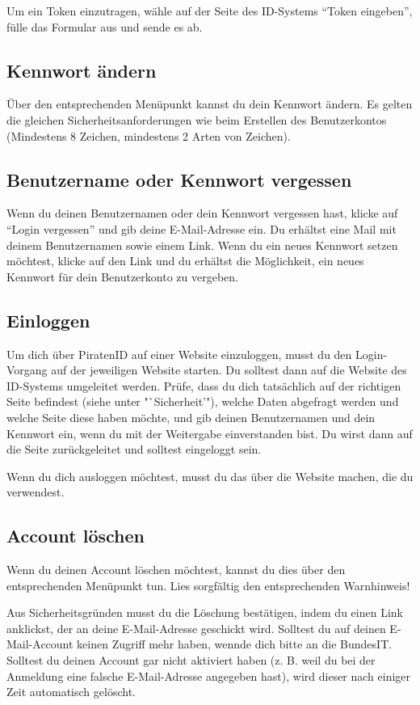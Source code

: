Um ein Token einzutragen, wähle auf der Seite des ID-Systems "`Token eingeben"', fülle das Formular aus und sende es ab.

\subsection{Kennwort ändern}
Über den entsprechenden Menüpunkt kannst du dein Kennwort ändern.
Es gelten die gleichen Sicherheitsanforderungen wie beim Erstellen des Benutzerkontos (Mindestens 8 Zeichen, mindestens 2 Arten von Zeichen).

\subsection{Benutzername oder Kennwort vergessen}
Wenn du deinen Benutzernamen oder dein Kennwort vergessen hast, klicke auf "`Login vergessen"' und gib deine E-Mail-Adresse ein.
Du erhältst eine Mail mit deinem Benutzernamen sowie einem Link.
Wenn du ein neues Kennwort setzen möchtest, klicke auf den Link und du erhältst die Möglichkeit, ein neues Kennwort für dein Benutzerkonto zu vergeben.

\subsection{Einloggen}
Um dich über PiratenID auf einer Website einzuloggen, musst du den Login-Vorgang auf der jeweiligen Website starten.
Du solltest dann auf die Website des ID-Systems umgeleitet werden.
Prüfe, dass du dich tatsächlich auf der richtigen Seite befindest (siehe unter "`Sicherheit'"),
welche Daten abgefragt werden und welche Seite diese haben möchte,
und gib deinen Benutzernamen und dein Kennwort ein, wenn du mit der Weitergabe einverstanden bist.
Du wirst dann auf die Seite zurückgeleitet und solltest eingeloggt sein.

Wenn du dich ausloggen möchtest, musst du das über die Website machen, die du verwendest.

\subsection{Account löschen}
Wenn du deinen Account löschen möchtest, kannst du dies über den entsprechenden Menüpunkt tun.
Lies sorgfältig den entsprechenden Warnhinweis!

Aus Sicherheitsgründen musst du die Löschung bestätigen, indem du einen Link anklickst, der an deine E-Mail-Adresse geschickt wird.
Solltest du auf deinen E-Mail-Account keinen Zugriff mehr haben, wennde dich bitte an die BundesIT.
Solltest du deinen Account gar nicht aktiviert haben (z. B. weil du bei der Anmeldung eine falsche E-Mail-Adresse angegeben hast),
wird dieser nach einiger Zeit automatisch gelöscht.

